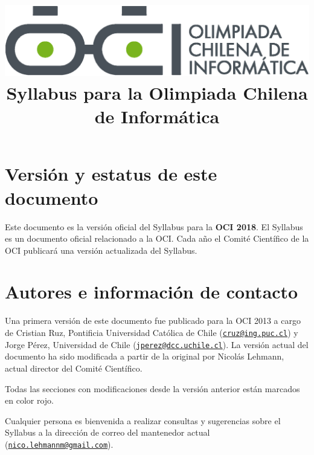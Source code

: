 \documentclass{article}
\newcommand{\new}{\color{red}}
\begin{document}
\title{
    \includegraphics[scale=0.2]{OCIlogo.eps}\\
    \vskip 20pt
    Syllabus para la Olimpiada Chilena de Informática}
\date{}
\maketitle

\section{Versión y estatus de este documento}
Este documento es la versión oficial del Syllabus para la \textbf{OCI 2018}.
El Syllabus es un documento oficial relacionado a la OCI.
Cada año el Comité Científico de la OCI publicará una versión actualizada del Syllabus.

\section{Autores e información de contacto}
Una primera versión de este documento fue publicado para la OCI 2013 a cargo de
Cristian Ruz, Pontificia Universidad Católica de Chile (\href{mailto:cruz@ing.puc.cl}{\nolinkurl{cruz@ing.puc.cl}}) y
Jorge Pérez, Universidad de Chile (\href{mailto:jperez@dcc.uchile.cl}{\nolinkurl{jperez@dcc.uchile.cl}}).
La versión actual del documento ha sido modificada a partir de la original por Nicolás Lehmann, actual director del Comité Científico.

{\new
  Todas las secciones con modificaciones desde la versión anterior están marcados en color rojo.
}

Cualquier persona es bienvenida a realizar consultas y sugerencias sobre el
Syllabus a la dirección de correo del mantenedor actual ({\new\href{mailto:nico.lehmannm@gmail.com}{\nolinkurl{nico.lehmannm@gmail.com}}}).
\end{document}
